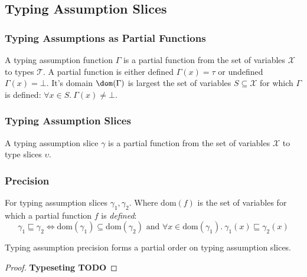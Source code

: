 \subsection{Typing Assumption Slices}
\subsubsection{Typing Assumptions as Partial Functions}
\begin{definition}
A typing assumption function $\Gamma$ is a partial function from the set of variables $\mathcal{X}$ to types $\mathcal{T}$. A partial function is either defined $\Gamma(x) = \tau$ or undefined $\Gamma(x) = \bot$. It's domain $\dom(\Gamma)$ is largest the set of variables $S \subseteq \mathcal{X}$ for which $\Gamma$ is defined: $\forall x \in S.\ \Gamma(x) \neq \bot$.
\end{definition}

\subsubsection{Typing Assumption Slices}
\begin{definition}
A typing assumption slice $\gamma$ is a partial function from the set of variables $\mathcal{X}$ to type slices $\upsilon$.
\end{definition}
\subsubsection{Precision}
\begin{definition}
For typing assumption slices $\gamma_1, \gamma_2$. Where $\mathrm{dom}(f)$ is the set of variables for which a partial function $f$ is \textit{defined}:
\[\gamma_1 \sqsubseteq \gamma_2 \iff \mathrm{dom}(\gamma_1) \subseteq \mathrm{dom}(\gamma_2) \text{ and } \forall x \in  \mathrm{dom}(\gamma_1).\ \gamma_1(x) \sqsubseteq \gamma_2(x)\]
\end{definition}
\begin{proposition}
Typing assumption precision forms a partial order on typing assumption slices.
\end{proposition}
\begin{proof}
\textbf{Typeseting TODO}
\end{proof}
